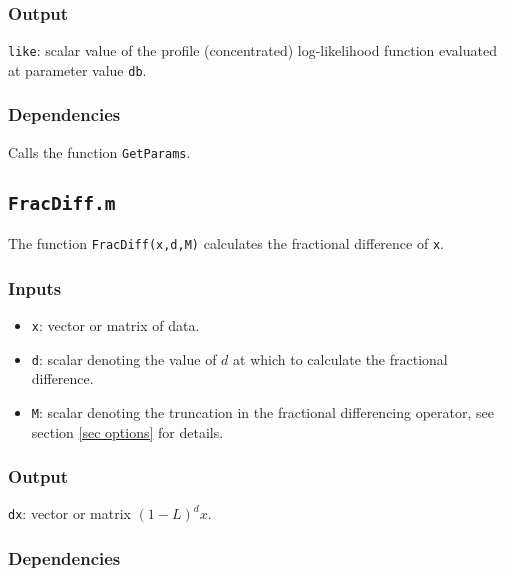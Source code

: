 \documentclass[12pt]{article}
\begin{document}
\subsubsection*{Output}

\texttt{like}: scalar value of the profile (concentrated) log-likelihood function evaluated at parameter value \texttt{db}.
 

\subsubsection*{Dependencies}

Calls the function \texttt{GetParams}.





\newpage


\subsection{\texttt{FracDiff.m}}

The function \texttt{FracDiff(x,d,M)} calculates the fractional difference of \texttt{x}.

\subsubsection*{Inputs}

\begin{itemize}

\item \texttt{x}: vector or matrix of data.

\item \texttt{d}: scalar denoting the value of $d$ at which to calculate the fractional difference.

\item \texttt{M}: scalar denoting the truncation in the fractional differencing operator, see section \ref{sec options} for details.

\end{itemize}


\subsubsection*{Output}

\texttt{dx}: vector or matrix $(1-L)^d x$.

\subsubsection*{Dependencies}
\end{document}
